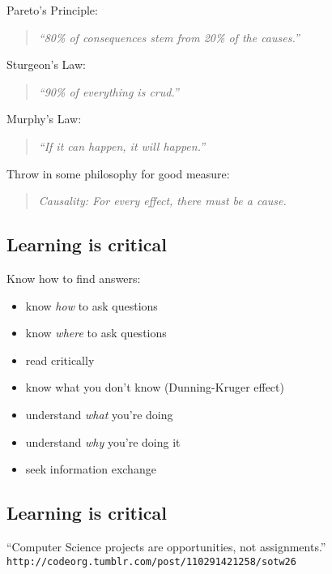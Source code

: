 \documentclass[xga]{xdvislides}
\begin{document}
Pareto's Principle:
\begin{quote}
{\em ``80\% of consequences stem from 20\% of the causes.''}
\end{quote}

Sturgeon's Law:
\begin{quote}
{\em ``90\% of everything is crud.''}
\end{quote}

Murphy's Law:
\begin{quote}
{\em ``If it can happen, it will happen.''}
\end{quote}

Throw in some philosophy for good measure:
\begin{quote}
{\em Causality: For every effect, there must be a cause.}
\end{quote}
\Normalsize

\subsection{Learning is critical}
Know how to find answers:
\begin{itemize}
	\item know {\em how} to ask questions
	\item know {\em where} to ask questions
	\item read critically
	\item know what you don't know (Dunning-Kruger effect)
	\item understand {\em what} you're doing
	\item understand {\em why} you're doing it
	\item seek information exchange
\end{itemize}

\subsection{Learning is critical}
\vspace{1in}
\Huge
\begin{center}
``Computer Science projects are opportunities,
not assignments.'' \\
\vspace{.5in}
\verb+http://codeorg.tumblr.com/post/110291421258/sotw26+
\end{center}
\Normalsize
\end{document}
